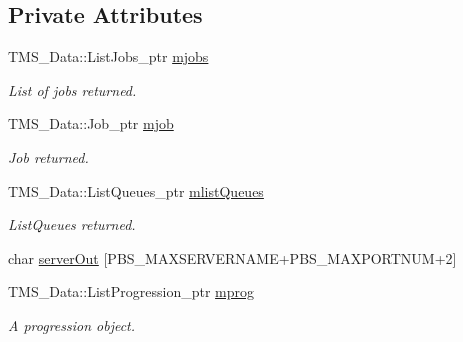 \subsection*{Private Attributes}
\begin{DoxyCompactItemize}
\item 
\hypertarget{classTorqueServer_ad3fa1d5687b1c0776c3f6f59aea8bc04}{
TMS\_\-Data::ListJobs\_\-ptr \hyperlink{classTorqueServer_ad3fa1d5687b1c0776c3f6f59aea8bc04}{mjobs}}
\label{classTorqueServer_ad3fa1d5687b1c0776c3f6f59aea8bc04}

\begin{DoxyCompactList}\small\item\em List of jobs returned. \item\end{DoxyCompactList}\item 
\hypertarget{classTorqueServer_a4cd336ecc71dec247367e6b26a52efab}{
TMS\_\-Data::Job\_\-ptr \hyperlink{classTorqueServer_a4cd336ecc71dec247367e6b26a52efab}{mjob}}
\label{classTorqueServer_a4cd336ecc71dec247367e6b26a52efab}

\begin{DoxyCompactList}\small\item\em Job returned. \item\end{DoxyCompactList}\item 
\hypertarget{classTorqueServer_ada6a31f5672ecf7297dfac26ed62e19a}{
TMS\_\-Data::ListQueues\_\-ptr \hyperlink{classTorqueServer_ada6a31f5672ecf7297dfac26ed62e19a}{mlistQueues}}
\label{classTorqueServer_ada6a31f5672ecf7297dfac26ed62e19a}

\begin{DoxyCompactList}\small\item\em ListQueues returned. \item\end{DoxyCompactList}\item 
char \hyperlink{classTorqueServer_ae798d6ea4f01fc4336756a0cba5a644c}{serverOut} \mbox{[}PBS\_\-MAXSERVERNAME+PBS\_\-MAXPORTNUM+2\mbox{]}
\item 
\hypertarget{classTorqueServer_addd31a54497c49a5ef552e96a0682518}{
TMS\_\-Data::ListProgression\_\-ptr \hyperlink{classTorqueServer_addd31a54497c49a5ef552e96a0682518}{mprog}}
\label{classTorqueServer_addd31a54497c49a5ef552e96a0682518}

\begin{DoxyCompactList}\small\item\em A progression object. \item\end{DoxyCompactList}\end{DoxyCompactItemize}


